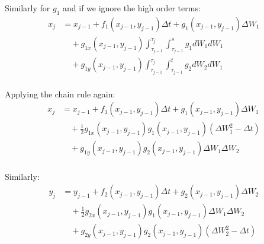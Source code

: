 \begin{frame}
Similarly for $g_1$ and if we ignore the high order terms:
	\begin{equation*}
	\begin{split}
	x_{j} &= x_{j-1}+f_1(x_{j-1},y_{j-1})\Delta t+g_1(x_{j-1},y_{j-1})\Delta W_1\\
	& \quad +g_{1x}(x_{j-1},y_{j-1})\int_{\tau_{j-1}}^{\tau_{j}}
	\int_{\tau_{j-1}}^{s}g_1dW_1dW_1\\
	& \quad	+g_{1y}(x_{j-1},y_{j-1})\int_{\tau_{j-1}}^{\tau_{j}}\int_{\tau_{j-1}}^{t}
	g_2dW_2dW_1\\
	\end{split}
	\end{equation*}	
\end{frame}


\begin{frame}
Applying the chain rule again:
	\begin{equation*}
	\begin{split}
	x_{j} &= x_{j-1}+f_1(x_{j-1},y_{j-1})\Delta t+g_1(x_{j-1},y_{j-1})\Delta W_1\\
	&\quad +\frac{1}{2}g_{1x}(x_{j-1},y_{j-1})g_{1}(x_{j-1},y_{j-1})(\Delta W_1^2-\Delta t)\\
	&\quad +g_{1y}(x_{j-1},y_{j-1})g_2(x_{j-1},y_{j-1})\Delta W_1 \Delta W_2\\
	\end{split}
	\end{equation*}
\end{frame}

\begin{frame}
Similarly:
\begin{equation*}
	\begin{split}
	y_{j}&=y_{j-1}+f_2(x_{j-1},y_{j-1})\Delta t+g_2(x_{j-1},y_{j-1})\Delta W_2\\
	&\quad +\frac{1}{2}g_{2x}(x_{j-1},y_{j-1})g_{1}(x_{j-1},y_{j-1})\Delta W_1 \Delta W_2\\
	&\quad +g_{2y}(x_{j-1},y_{j-1})g_2(x_{j-1},y_{j-1})(\Delta W_2^2-\Delta t)\\
	\end{split}
	\end{equation*}
\end{frame}




